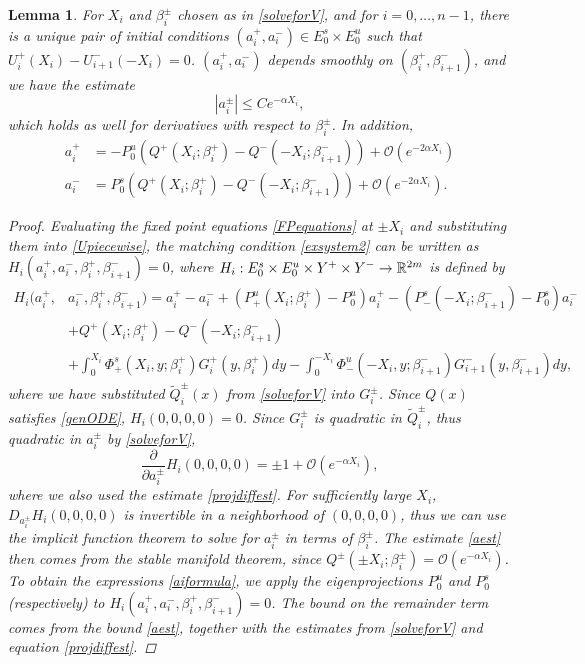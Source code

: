 \documentclass[12pt]{elsarticle}
\theoremstyle{plain}
\newtheorem{lemma}[theorem]{Lemma}
\theoremstyle{definition}
\theoremstyle{remark}
\numberwithin{theorem}{section}
\numberwithin{equation}{section}
\begin{document}
\begin{lemma}\label{solvefora}
For $X_i$ and $\beta_i^\pm$ chosen as in \cref{solveforV}, and for $i = 0, \dots, n-1$, there is a unique pair of initial conditions $(a_i^+, a_i^-) \in E_0^s \times E_0^u$ such that $U_i^+(X_i) - U_{i+1}^-(-X_i) = 0$. $(a_i^+, a_i^-)$ depends smoothly on $(\beta_i^+, \beta_{i+1}^-)$, and we have the estimate
\begin{equation}\label{aest}
|a_i^\pm| \leq C e^{-\alpha X_i},
\end{equation}
which holds as well for derivatives with respect to $\beta_i^\pm$. In addition,
\begin{equation}\label{aiformula}
\begin{aligned}
a_i^+ &= -P^u_0 \left( Q^+(X_i; \beta_i^+) - Q^-(-X_i; \beta_{i+1}^-) \right) + \mathcal{O}( e^{-2 \alpha X_i} ) \\
a_i^- &= P^s_0 \left( Q^+(X_i; \beta_i^+) - Q^-(-X_i; \beta_{i+1}^-) \right) + \mathcal{O}\left( e^{-2 \alpha X_i} \right).
\end{aligned}
\end{equation}

\begin{proof}
Evaluating the fixed point equations \cref{FPequations} at $\pm X_i$ and substituting them into \cref{Upiecewise}, the matching condition \cref{exsystem2} can be written as $H_i(a_i^+, a_i^-, \beta_i^+, \beta_{i+1}^-) = 0$, where $H_i: E_0^s \times E_0^u \times Y^+ \times Y^- \rightarrow \mathbb{R}^{2m}$ is defined by
\begin{align*}
H_i(a_i^+, &a_i^-, \beta_i^+, \beta_{i+1}^-) 
= a_i^+ - a_i^- + (P^u_+(X_i; \beta_i^+) -  P^u_0)a_i^+ - (P^s_-(-X_i; \beta_{i+1}^-) - P^s_0) a_i^-  \\
&+ Q^+(X_i; \beta_i^+) - Q^-(-X_i; \beta_{i+1}^-)\\
&+ \int_0^{X_i} \Phi_+^s(X_i, y; \beta_i^+) G_i^+(y,\beta_i^+)dy
- \int_0^{-X_i} \Phi_-^u(-X_i, y; \beta_{i+1}^-) G_{i+1}^-(y,\beta_{i+1}^-)dy,
\end{align*}
where we have substituted $\tilde{Q}_i^\pm(x)$ from \cref{solveforV} into $G_i^\pm$. Since $Q(x)$ satisfies \cref{genODE}, $H_i(0, 0, 0, 0) = 0$. Since $G_i^\pm$ is quadratic in $\tilde{Q}_i^\pm$, thus quadratic in $a_i^\pm$ by \cref{solveforV},
\[
\frac{\partial}{\partial a_i^\pm} H_i(0, 0, 0, 0) = \pm 1 + \mathcal{O} (e^{-\alpha X_i}),
\]
where we also used the estimate \cref{projdiffest}. For sufficiently large $X_i$, $D_{a_i^\pm} H_i(0, 0, 0, 0)$ is invertible in a neighborhood of $(0, 0, 0, 0)$, thus we can use the implicit function theorem to solve for $a_i^\pm$ in terms of $\beta_i^\pm$. The estimate \cref{aest} then comes from the stable manifold theorem, since $Q^\pm(\pm X_i; \beta_i^\pm) = \mathcal{O}(e^{-\alpha X_i})$. To obtain the expressions \cref{aiformula}, we apply the eigenprojections $P^u_0$ and $P^s_0$ (respectively) to $H_i(a_i^+, a_i^-, \beta_i^+, \beta_{i+1}^-) = 0$. The bound on the remainder term comes from the bound \cref{aest}, together with the estimates from \cref{solveforV} and equation \cref{projdiffest}. 
\end{proof}
\end{lemma}
\end{document}
